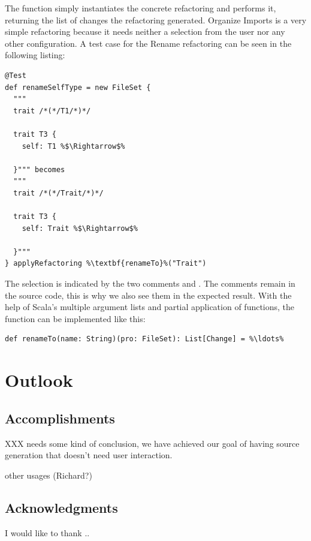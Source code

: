 \documentclass[10pt,a4paper,oneside]{scrreprt}
\begin{document}
The  function simply instantiates the concrete refactoring and performs it, returning the list of changes the refactoring generated. Organize Imports is a very simple refactoring because it needs neither a selection from the user nor any other configuration. A test case for the Rename refactoring can be seen in the following listing:

\begin{lstlisting}
@Test
def renameSelfType = new FileSet {
  """
  trait /*(*/T1/*)*/

  trait T3 {
    self: T1 %$\Rightarrow$%

  }""" becomes
  """
  trait /*(*/Trait/*)*/

  trait T3 {
    self: Trait %$\Rightarrow$%

  }"""
} applyRefactoring %\textbf{renameTo}%("Trait")
\end{lstlisting}

The selection is indicated by the two comments \src{/*(*/} and \src{/*)*/}. The comments remain in the source code, this is why we also see them in the expected result. With the help of Scala's multiple argument lists and partial application of functions, the  function can be implemented like this:

\begin{lstlisting}
def renameTo(name: String)(pro: FileSet): List[Change] = %\ldots%
\end{lstlisting}


\chapter{Outlook} \label{chapter:outlook}

\section{Accomplishments}

XXX needs some kind of conclusion, we have achieved our goal of having source generation that doesn't need user interaction.

other usages (Richard?)


\section{Acknowledgments}

I would like to thank ..
\end{document}
